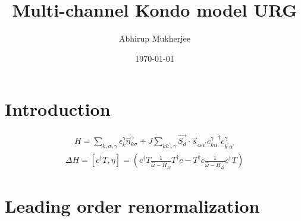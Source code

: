 \documentclass[12pt]{article}
\begin{document}
\title{Multi-channel Kondo model URG}
\author{Abhirup Mukherjee}
\date{\today}
\maketitle
\section{Introduction}

\begin{equation}\begin{aligned}
	H = \sum_{k,\sigma,\gamma}\epsilon_{k}^\gamma \hat n^\gamma_{k\sigma} + J\sum_{kk^\prime,\gamma} \vec{S_d}\cdot\vec{s}_{\alpha\alpha^\prime}{c^\gamma_{k\alpha}}^\dagger c^\gamma_{k^\prime\alpha^\prime}
\end{aligned}\end{equation}
\begin{equation}\begin{aligned}
	\Delta H = \left[c^\dagger T, \eta \right] = \left(c^\dagger T \frac{1}{\hat \omega - H_D}T^\dagger c - T^\dagger c \frac{1}{\hat \omega - H_D}c^\dagger T\right)
\end{aligned}\end{equation}

\section{Leading order renormalization}
\end{document}
